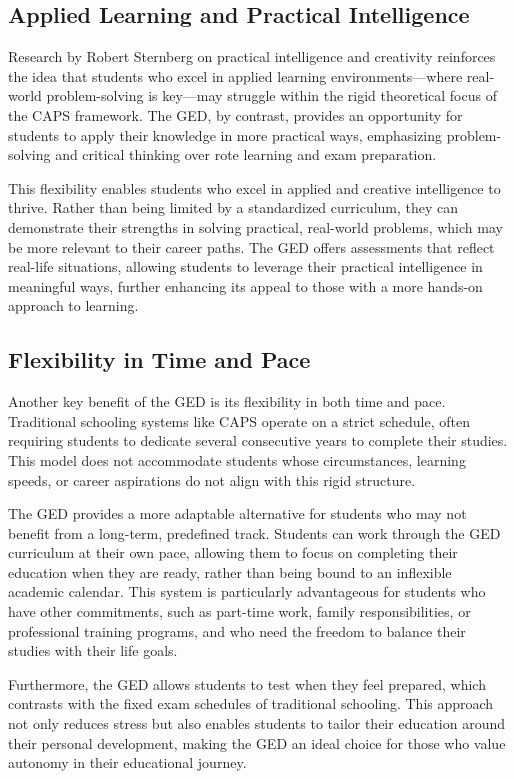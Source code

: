 \documentclass[12pt]{article}
\begin{document}
\subsection{Applied Learning and Practical Intelligence}

Research by Robert Sternberg on practical intelligence and creativity reinforces the idea that students who excel in applied learning environments—where real-world problem-solving is key—may struggle within the rigid theoretical focus of the CAPS framework. The GED, by contrast, provides an opportunity for students to apply their knowledge in more practical ways, emphasizing problem-solving and critical thinking over rote learning and exam preparation.

This flexibility enables students who excel in applied and creative intelligence to thrive. Rather than being limited by a standardized curriculum, they can demonstrate their strengths in solving practical, real-world problems, which may be more relevant to their career paths. The GED offers assessments that reflect real-life situations, allowing students to leverage their practical intelligence in meaningful ways, further enhancing its appeal to those with a more hands-on approach to learning.

\subsection{Flexibility in Time and Pace}

Another key benefit of the GED is its flexibility in both time and pace. Traditional schooling systems like CAPS operate on a strict schedule, often requiring students to dedicate several consecutive years to complete their studies. This model does not accommodate students whose circumstances, learning speeds, or career aspirations do not align with this rigid structure.

The GED provides a more adaptable alternative for students who may not benefit from a long-term, predefined track. Students can work through the GED curriculum at their own pace, allowing them to focus on completing their education when they are ready, rather than being bound to an inflexible academic calendar. This system is particularly advantageous for students who have other commitments, such as part-time work, family responsibilities, or professional training programs, and who need the freedom to balance their studies with their life goals.

Furthermore, the GED allows students to test when they feel prepared, which contrasts with the fixed exam schedules of traditional schooling. This approach not only reduces stress but also enables students to tailor their education around their personal development, making the GED an ideal choice for those who value autonomy in their educational journey.
\end{document}
